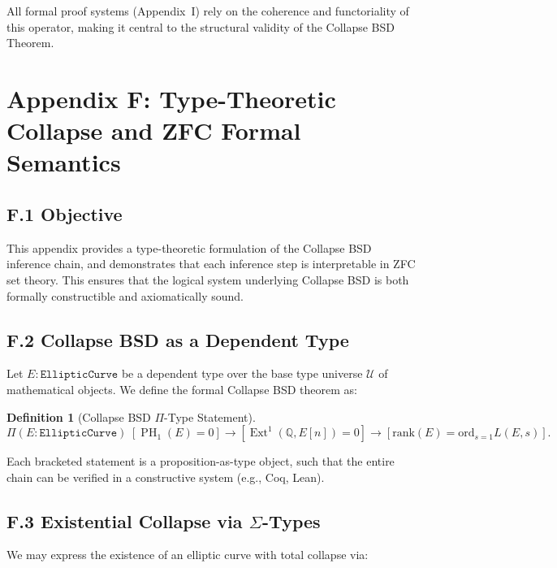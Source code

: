 \documentclass[11pt]{article}
\newtheorem{definition}[theorem]{Definition}
\DeclareMathOperator{\Ext}{Ext}
\DeclareMathOperator{\PH}{PH}
\newcommand{\QQ}{\mathbb{Q}}
\begin{document}
All formal proof systems (Appendix~I) rely on the coherence and functoriality of this operator, making it central to the structural validity of the Collapse BSD Theorem.




\section*{Appendix F: Type-Theoretic Collapse and ZFC Formal Semantics}

\subsection*{F.1 Objective}

This appendix provides a type-theoretic formulation of the Collapse BSD inference chain, and demonstrates that each inference step is interpretable in ZFC set theory.  
This ensures that the logical system underlying Collapse BSD is both formally constructible and axiomatically sound.

\subsection*{F.2 Collapse BSD as a Dependent Type}

Let $E : \texttt{EllipticCurve}$ be a dependent type over the base type universe $\mathcal{U}$ of mathematical objects.  
We define the formal Collapse BSD theorem as:

\begin{definition}[Collapse BSD $\Pi$-Type Statement]
\[
\Pi (E : \texttt{EllipticCurve})\; 
[\PH_1(E) = 0] \to [\Ext^1(\QQ,E[n]) = 0] \to [\mathrm{rank}(E) = \mathrm{ord}_{s=1} L(E,s)].
\]
\end{definition}

Each bracketed statement is a proposition-as-type object, such that the entire chain can be verified in a constructive system (e.g., Coq, Lean).

\subsection*{F.3 Existential Collapse via $\Sigma$-Types}

We may express the existence of an elliptic curve with total collapse via:
\end{document}

